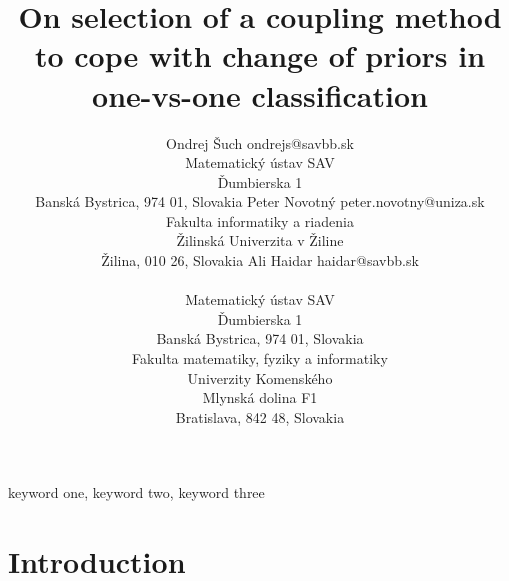 \documentclass[twoside,11pt]{article}
\begin{document}
\title{On selection of a coupling method to cope with change of priors in one-vs-one classification }

\author{\name Ondrej Šuch \email ondrejs@savbb.sk \\
       \addr Matematický ústav SAV\\
       Ďumbierska 1\\
       Banská Bystrica, 974 01, Slovakia
       \AND
       \name Peter Novotný \email peter.novotny@uniza.sk \\
       \addr Fakulta informatiky a riadenia\\
       Žilinská Univerzita v Žiline\\
       Žilina, 010 26, Slovakia
       \AND
       \name Ali Haidar \email haidar@savbb.sk \\
       \begin{minipage}[t]{0.45\textwidth}
       \addr Matematický ústav SAV\\
       Ďumbierska 1\\
       Banská Bystrica, 974 01, Slovakia
       \end{minipage}\hfill
       \begin{minipage}[t]{0.45\textwidth}
       \addr Fakulta matematiky, fyziky a informatiky\\
       Univerzity Komenského \\
       Mlynská dolina F1 \\
       Bratislava, 842 48, Slovakia
       \end{minipage}
       }


\maketitle

\begin{abstract}%
\blindtext
\end{abstract}

\begin{keywords}
  keyword one, keyword two, keyword three
\end{keywords}

\section{Introduction}

\end{document}
